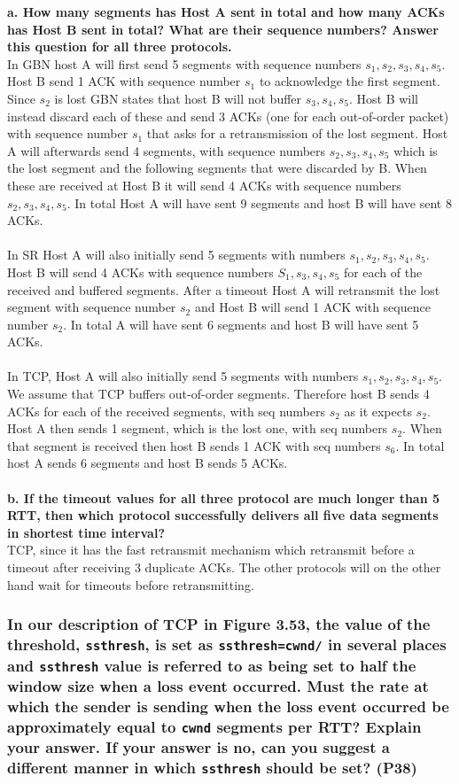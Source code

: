 \textbf{a. How many segments has Host A sent in total and how many ACKs has Host B sent in total? What are their sequence numbers? Answer this  question for all three protocols.} \\
In GBN host A will first send 5 segments with sequence numbers $s_1, s_2, s_3, s_4, s_5$. Host B send 1 ACK with sequence number $s_1$ to acknowledge the first segment. Since $s_2$ is lost GBN states that host B will not buffer $s_3, s_4, s_5$. Host B will instead discard each of these and send 3 ACKs (one for each out-of-order packet) with sequence number $s_1$ that asks for a retransmission of the lost segment. Host A will afterwards send 4 segments, with sequence numbers $s_2, s_3, s_4, s_5$ which is the lost segment and the following segments that were discarded by B. When these are received at Host B it will send 4 ACKs with sequence numbers $s_2, s_3, s_4, s_5$. In total Host A will have sent 9 segments and host B will have sent 8 ACKs. \\
\\
In SR Host A will also initially send 5 segments with numbers $s_1, s_2, s_3, s_4, s_5$. Host B will send 4 ACKs with sequence numbers $S_1, s_3, s_4, s_5$ for each of the received and buffered segments. After a timeout Host A will retransmit the lost segment with sequence number $s_2$ and Host B will send 1 ACK with sequence number $s_2$. In total A will have sent 6 segments and host B will have sent 5 ACKs. \\
\\
In TCP, Host A will also initially send 5 segments with numbers $s_1, s_2, s_3, s_4, s_5$. We assume that TCP buffers out-of-order segments. Therefore host B sends 4 ACKs for each of the received segments, with seq numbers $s_2$ as it expects $s_2$. Host A then sends 1 segment, which is the lost one, with seq numbers $s_2$. When that segment is received then host B sends 1 ACK with seq numbers $s_6$. In total host A sends 6 segments and host B sends 5 ACKs. \\
\\
\textbf{b. If the timeout values for all three protocol are much longer than 5 RTT, then which protocol successfully delivers all five data segments in shortest time interval?} \\
TCP, since it has the fast retransmit mechanism which retransmit before a timeout after receiving 3 duplicate ACKs. The other protocols will on the other hand wait for timeouts before retransmitting.


\subsubsection{In our description of TCP in Figure 3.53, the value of the threshold,  \texttt{ssthresh}, is set as \texttt{ssthresh=cwnd/} in several places and \texttt{ssthresh} value is referred to as being set to half the window size when a loss event occurred. Must the rate at which the sender is sending when the loss event occurred be approximately equal to \texttt{cwnd} segments per RTT? Explain your answer. If your answer is no, can you suggest a different  manner in which \texttt{ssthresh} should be set? (P38)}

